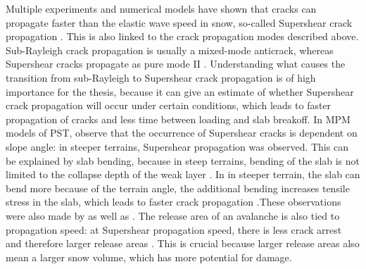  Multiple experiments and numerical models have shown that cracks can propagate faster than the elastic wave speed in snow, so-called Supershear crack propagation \parencite{trottetTransitionSubRayleighAnticrack2022,bobillierNumericalInvestigationCrack2024,bergfeldSignaturesSubRayleighSupershear2025}. This is also linked to the crack propagation modes described above. Sub-Rayleigh crack propagation is usually a mixed-mode anticrack, whereas Supershear cracks propagate as pure mode II \parencite{rosendahlModelingSnowSlab2020,trottetTransitionSubRayleighAnticrack2022}. Understanding what causes the transition from sub-Rayleigh to Supershear crack propagation is of high importance for the thesis, because it can give an estimate of whether Supershear crack propagation will occur under certain conditions, which leads to faster propagation of cracks and less time between loading and slab breakoff. In MPM models of PST, \cite{trottetTransitionSubRayleighAnticrack2022} observe that the occurrence of Supershear cracks is dependent on slope angle: in steeper terrains, Supershear propagation was observed. This can be explained by slab bending, because in steep terrains, bending of the slab is not limited to the collapse depth of the weak layer \parencite{trottetTransitionSubRayleighAnticrack2022}. In  in steeper terrain, the slab can bend more because of the terrain angle, the additional bending increases tensile stress in the slab, which leads to faster crack propagation \parencite{trottetTransitionSubRayleighAnticrack2022}.These observations were also made by \cite{bobillierNumericalInvestigationCrack2024} as well as \cite{bergfeldSignaturesSubRayleighSupershear2025}. The release area of an avalanche is also tied to propagation speed: at Supershear propagation speed, there is less crack arrest and therefore larger release areas \parencite{trottetTransitionSubRayleighAnticrack2022,bergfeldSignaturesSubRayleighSupershear2025}. This is crucial because larger release areas also mean a larger snow volume, which has more potential for damage. \par

